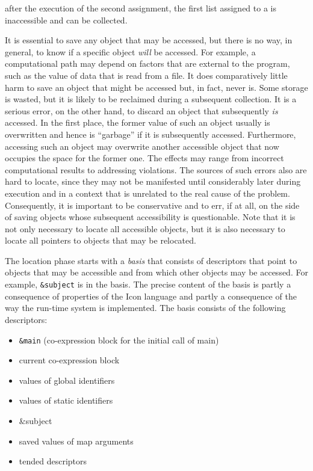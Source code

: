 \noindent after the execution of the second assignment, the first list
assigned to a is inaccessible and can be collected.

It is essential to save any object that may be accessed, but there is
no way, in general, to know if a specific object \textit{will} be
accessed. For example, a computational path may depend on factors that
are external to the program, such as the value of data that is read
from a file. It does comparatively little harm to save an object that
might be accessed but, in fact, never is. Some storage is wasted, but
it is likely to be reclaimed during a subsequent collection. It is a
serious error, on the other hand, to discard an object that
subsequently \textit{is} accessed. In the first place, the former
value of such an object usually is overwritten and hence is
``garbage'' if it is subsequently accessed. Furthermore, accessing
such an object may overwrite another accessible object that now
occupies the space for the former one. The effects may range from
incorrect computational results to addressing violations. The sources
of such errors also are hard to locate, since they may not be
manifested until considerably later during execution and in a context
that is unrelated to the real cause of the problem. Consequently, it
is important to be conservative and to err, if at all, on the side of
saving objects whose subsequent accessibility is questionable. Note
that it is not only necessary to locate all accessible objects, but it
is also necessary to locate all pointers to objects that may be
relocated.


The location phase starts with a \textit{basis} that consists of
descriptors that point to objects that may be accessible and from
which other objects may be accessed. For example, \texttt{\&subject}
is in the basis. The precise content of the basis is partly a
consequence of properties of the Icon language and partly a
consequence of the way the run-time system is implemented. The basis
consists of the following descriptors:

\liststyleLxiii
\begin{itemize}
\item 
\texttt{\&main} (co-expression block for the initial call of main)
\item 
current co-expression block
\item 
values of global identifiers
\item 
values of static identifiers
\item {\ttfamily
\&subject}
\item 
saved values of map arguments
\item 
tended descriptors
\end{itemize}

